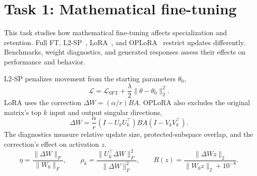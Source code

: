 \documentclass{article}
\begin{document}
\section{Task 1: Mathematical fine-tuning}
This task studies how mathematical fine-tuning affects specialization and retention. Full FT, L2-SP~\citep{li2018l2sp}, LoRA~\citep{hu2021lora}, and OPLoRA~\citep{xiong2026oplora} restrict updates differently. Benchmarks, weight diagnostics, and generated responses assess their effects on performance and behavior.

L2-SP penalizes movement from the starting parameters \(\theta_0\),
\[
\mathcal L=\mathcal L_{\mathrm{SFT}}
+\frac{\lambda}{2}\|\theta-\theta_0\|_2^2.
\]
LoRA uses the correction \(\Delta W=(\alpha/r)BA\). OPLoRA also excludes the original matrix's top \(k\) input and output singular directions,
\[
\Delta W=\frac{\alpha}{r}
(I-U_kU_k^\top)BA(I-V_kV_k^\top).
\]
The diagnostics measure relative update size, protected-subspace overlap, and the correction's effect on activation \(z\),
\[
\eta=\frac{\|\Delta W\|_F}{\|W_0\|_F},
\qquad
\rho_k=\frac{\|U_k^\top\Delta W\|_F^2}{\|\Delta W\|_F^2},
\qquad
R(z)=\frac{\|\Delta Wz\|_2}{\|W_0z\|_2+10^{-8}}.
\]
\end{document}
